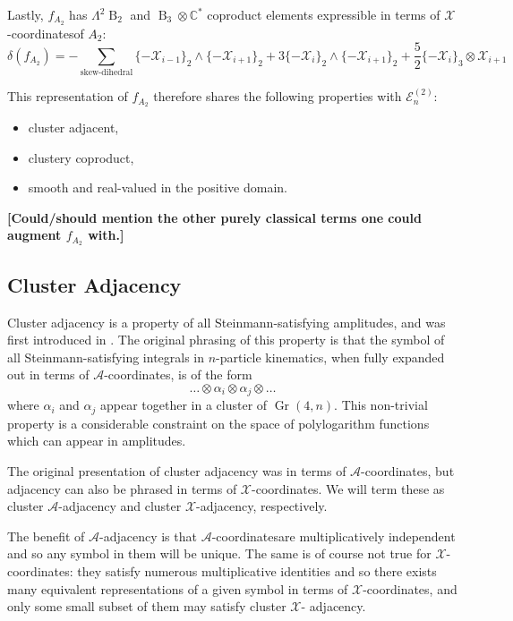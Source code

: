 \documentclass[11pt]{article}
\DeclareMathOperator{\B}{B}
\DeclareMathOperator{\Gr}{Gr}
\def\x{\mathcal{X}}
\def\xcoords{$\mathcal{X}$-coordinates}
\def\a{\mathcal{A}}
\def\acoords{$\mathcal{A}$-coordinates}
\def\draftnote#1{{\bf [#1]}}
\begin{document}
Lastly, $f_{A_2}$ has $\Lambda^2\B_2$ and $\B_3 \otimes \mathbb{C}^*$ coproduct elements expressible in terms of \xcoords of $A_2$:
\begin{equation}
	\delta\left(f_{A_2}\right) = -\sum_{\text{skew-dihedral}} \{-\x_{i-1}\}_2 \wedge \{-\x_{i+1}\}_2 + 3\{-\x_{i}\}_2 \wedge \{-\x_{i+1}\}_2 + \frac{5}{2}\{-\x_{i}\}_3 \otimes \x_{i+1}
\end{equation}

This representation of $f_{A_2}$ therefore shares the following properties with $\mathcal{E}^{(2)}_n$:
\begin{itemize}
	\item cluster adjacent,
	\item clustery coproduct,
	\item smooth and real-valued in the positive domain.
\end{itemize}

\draftnote {Could/should mention the other purely classical terms one could augment $f_{A_2}$ with.}

\subsection{Cluster Adjacency}

Cluster adjacency is a property of all Steinmann-satisfying amplitudes, and was first introduced in \cite{Drummond:2017ssj}. The original phrasing of this property is that the symbol of all Steinmann-satisfying integrals in $n$-particle kinematics, when fully expanded out in terms of \acoords, is of the form 
\begin{equation}
	\ldots \otimes \alpha_i \otimes \alpha_j\otimes \ldots 
\end{equation}
where $\alpha_i$ and $\alpha_j$ appear together in a cluster of $\Gr(4,n)$. This non-trivial property is a considerable constraint on the space of polylogarithm functions which can appear in amplitudes. 

The original presentation of cluster adjacency was in terms of \acoords, but adjacency can also be phrased in terms of \xcoords. We will term these as cluster $\a$-adjacency and cluster $\x$-adjacency, respectively. 

The benefit of $\a$-adjacency is that \acoords are multiplicatively independent and so any symbol in them will be unique. The same is of course not true for \xcoords: they satisfy numerous multiplicative identities and so there exists many equivalent representations of a given symbol in terms of \xcoords, and only some small subset of them may satisfy cluster $\x$- adjacency. 
\end{document}
